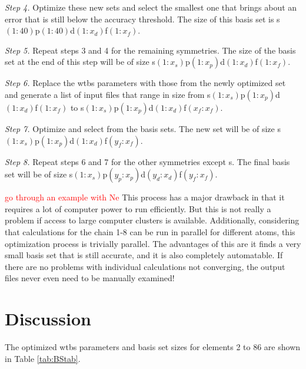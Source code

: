 \documentclass[12pt]{report}
\newcommand{\notetodylan}[1]{\textcolor{red}{#1}} %
\begin{document}
\textit{Step 4.} Optimize these new sets and select the smallest one that brings about an error that is still below the accuracy threshold. The size of this basis set is s$(1:40)$p$(1:40)$d$(1:x_{d})$f$(1:x_{f})$.

\textit{Step 5.} Repeat steps 3 and 4 for the remaining symmetries. The size of the basis set at the end of this step will be of size s$(1:x_{s})$p$(1:x_{p})$d$(1:x_{d})$f$(1:x_{f})$.

\textit{Step 6.} Replace the wtbs parameters with those from the newly optimized set and generate a list of input files that range in size from s$(1:x_{s})$p$(1:x_{p})$d$(1:x_{d})$f$(1:x_{f})$ to s$(1:x_{s})$p$(1:x_{p})$d$(1:x_{d})$f$(x_{f}:x_{f})$.

\textit{Step 7.} Optimize and select from the basis sets. The new set will be of size s$(1:x_{s})$p$(1:x_{p})$d$(1:x_{d})$f$(y_{f}:x_{f})$.

\textit{Step 8.} Repeat steps 6 and 7 for the other symmetries except s. The final basis set will be of size s$(1:x_{s})$p$(y_{p}:x_{p})$d$(y_{d}:x_{d})$f$(y_{f}:x_{f})$.

\notetodylan{go through an example with Ne} This process has a major drawback in that it requires a lot of computer power to run efficiently. But this is not really a problem if access to large computer clusters is available. Additionally, considering that calculations for the chain 1-8 can be run in parallel for different atoms, this optimization process is trivially parallel. The advantages of this are it finds a very small basis set that is still accurate, and it is also completely automatable. If there are no problems with individual calculations not converging, the output files never even need to be manually examined!

\section{Discussion}

The optimized wtbs parameters and basis set sizes for elements 2 to 86 are shown in Table \ref{tab:BStab}.
\end{document}
